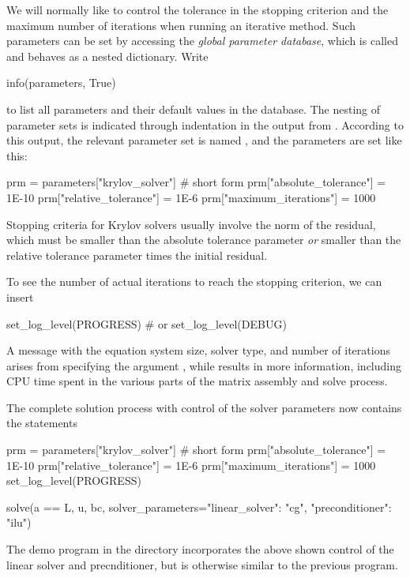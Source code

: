 We will normally like to control
the tolerance in the stopping criterion and the maximum number
of iterations when running an iterative method.
Such parameters can be set by accessing
the \emph{global parameter database}, which is called
 and behaves as a nested dictionary. Write
\begin{python}
info(parameters, True)
\end{python}
to list all parameters and their default values in the database.
The nesting of parameter sets is indicated through indentation in the
output from .
According to this output, the relevant parameter set is
named , and the parameters are set like this:
\begin{python}
prm = parameters["krylov_solver"] # short form
prm["absolute_tolerance"] = 1E-10
prm["relative_tolerance"] = 1E-6
prm["maximum_iterations"] = 1000
\end{python}
Stopping criteria for Krylov solvers usually involve the norm of
the residual, which must be smaller than the absolute tolerance
parameter \emph{or} smaller than the relative tolerance parameter times
the initial residual.

To see the number of actual iterations to reach the stopping criterion,
we can insert
\begin{python}
set_log_level(PROGRESS)
# or
set_log_level(DEBUG)
\end{python}
A message with the equation system size, solver type, and number of
iterations arises from specifying the argument , while
 results in more information, including CPU time spent in
the various parts of the matrix assembly and solve process.

The complete solution process with control of the solver parameters
now contains the statements
\begin{python}
prm = parameters["krylov_solver"] # short form
prm["absolute_tolerance"] = 1E-10
prm["relative_tolerance"] = 1E-6
prm["maximum_iterations"] = 1000
set_log_level(PROGRESS)

solve(a == L, u, bc,
      solver_parameters={"linear_solver": "cg",
                         "preconditioner": "ilu"})
\end{python}
The demo program  in the
 directory incorporates the above shown control
of the linear solver and precnditioner, but
is otherwise similar to the previous  program.

